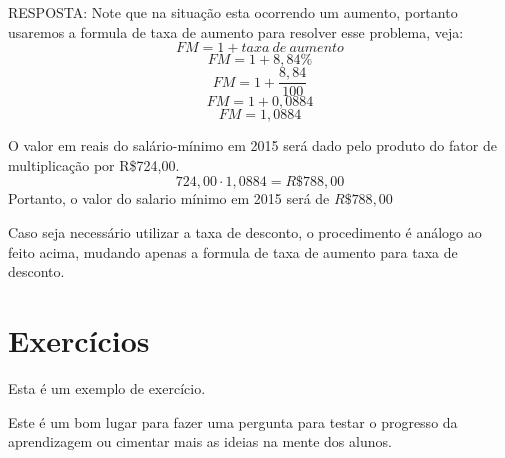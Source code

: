 RESPOSTA: Note que na situação esta ocorrendo um aumento, portanto usaremos a formula de taxa de aumento para resolver esse problema, veja:
$$FM=1+taxa~de~aumento$$
$$FM=1+8,84\%$$
$$FM=1+\frac{8,84}{100}$$
$$FM=1+0,0884$$
$$FM=1,0884$$

O valor em reais do salário-mínimo em 2015 será dado pelo produto do fator de multiplicação por R\$724,00.
$$724,00\cdot1,0884=R\$788,00$$
Portanto, o valor do salario mínimo em 2015 será de $R\$788,00$

Caso seja necessário utilizar a taxa de desconto, o procedimento é análogo ao feito acima, mudando apenas a formula de taxa de aumento para taxa de desconto.
	

\section{Exercícios}

Esta é um exemplo de exercício.

	\begin{exercise}
	Este é um bom lugar para fazer uma pergunta para testar o progresso da aprendizagem ou cimentar mais as ideias na mente dos alunos.
	\end{exercise}
